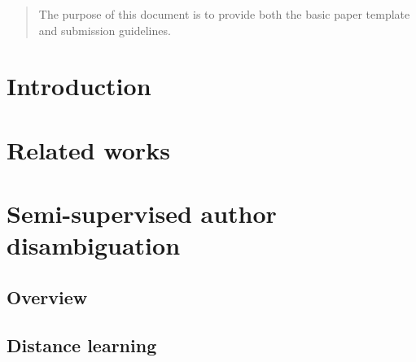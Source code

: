\documentclass{article}
\begin{document}

\begin{abstract}
The purpose of this document is to provide both the basic paper template and
submission guidelines.
\end{abstract}



\section{Introduction}
\label{introduction}




\section{Related works}
\label{relate-works}



\section{Semi-supervised author disambiguation}
\label{methods}

\subsection{Overview}

\subsection{Distance learning}
\end{document}
